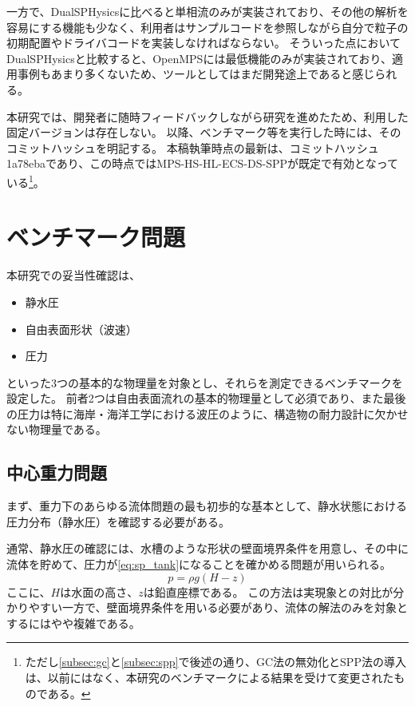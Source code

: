 		一方で、DualSPHysicsに比べると単相流のみが実装されており、その他の解析を容易にする機能も少なく、利用者はサンプルコードを参照しながら自分で粒子の初期配置やドライバコードを実装しなければならない。
		そういった点においてDualSPHysicsと比較すると、OpenMPSには最低機能のみが実装されており、適用事例もあまり多くないため、ツールとしてはまだ開発途上であると感じられる。

		本研究では、開発者に随時フィードバックしながら研究を進めたため、利用した固定バージョンは存在しない。
		以降、ベンチマーク等を実行した時には、そのコミットハッシュを明記する。
		本稿執筆時点の最新は、コミットハッシュ1a78ebaであり、この時点ではMPS-HS-HL-ECS-DS-SPPが既定で有効となっている\footnote{ただし\cref{subsec:gc}と\cref{subsec:spp}で後述の通り、GC法の無効化とSPP法の導入は、以前にはなく、本研究のベンチマークによる結果を受けて変更されたものである。}。

\section{ベンチマーク問題 \label{sec:benchmark}}
	本研究での妥当性確認は、
	\begin{itemize}
		\item 静水圧
		\item 自由表面形状（波速）
		\item 圧力
	\end{itemize}
	といった3つの基本的な物理量を対象とし、それらを測定できるベンチマークを設定した。
	前者2つは自由表面流れの基本的物理量として必須であり、また最後の圧力は特に海岸・海洋工学における波圧のように、構造物の耐力設計に欠かせない物理量である。

	\subsection{中心重力問題 \label{subsec:centralgravity}}
		まず、重力下のあらゆる流体問題の最も初歩的な基本として、静水状態における圧力分布（静水圧）を確認する必要がある。

		通常、静水圧の確認には、水槽のような形状の壁面境界条件を用意し、その中に流体を貯めて、圧力が\cref{eq:sp_tank}になることを確かめる問題が用いられる。
		\begin{equation}
			p = \rho g \left( H - z \right) \label{eq:sp_tank}
		\end{equation}
		ここに、$H$は水面の高さ、$z$は鉛直座標である。
		この方法は実現象との対比が分かりやすい一方で、壁面境界条件を用いる必要があり、流体の解法のみを対象とするにはやや複雑である。

